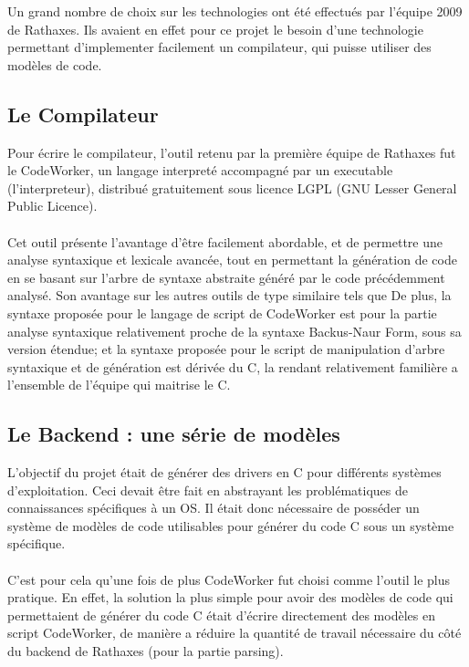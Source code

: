 \documentclass{rtxreport}
\begin{document}
Un grand nombre de choix sur les technologies ont été effectués par
l'équipe 2009 de Rathaxes. Ils avaient en effet pour ce projet le besoin d'une
technologie permettant d'implementer facilement un compilateur, qui puisse
utiliser des modèles de code.

\subsection{Le Compilateur}

Pour écrire le compilateur, l'outil retenu par la première équipe de Rathaxes
fut le CodeWorker, un langage interpreté accompagné par un executable
(l'interpreteur), distribué gratuitement sous licence LGPL (GNU Lesser General
Public Licence).
\\
\\
Cet outil présente l'avantage d'être facilement abordable, et de permettre
une analyse syntaxique et lexicale avancée, tout en permettant la génération
de code en se basant sur l'arbre de syntaxe abstraite généré par le code
précédemment analysé. Son avantage sur les autres outils de type similaire tels
que
De plus, la syntaxe proposée pour le langage de script de CodeWorker est pour
la partie analyse syntaxique relativement proche de la syntaxe Backus-Naur Form,
sous sa version étendue; et la syntaxe proposée pour le script de manipulation
d'arbre syntaxique et de génération est dérivée du C, la rendant relativement
familière a l'ensemble de l'équipe qui maitrise le C.

\subsection{Le Backend : une série de modèles}

L'objectif du projet était de générer des drivers en C pour différents systèmes
d'exploitation. Ceci devait être fait en abstrayant les problématiques de
connaissances spécifiques à un OS. Il était donc nécessaire de posséder un
système de modèles de code utilisables pour générer du code C sous un système
spécifique.
\\
\\
C'est pour cela qu'une fois de plus CodeWorker fut choisi comme l'outil le plus
pratique. En effet, la solution la plus simple pour avoir des modèles de code
qui permettaient de générer du code C était d'écrire directement des modèles
en script CodeWorker, de manière a réduire la quantité de travail nécessaire
du côté du backend de Rathaxes (pour la partie parsing).
\end{document}
